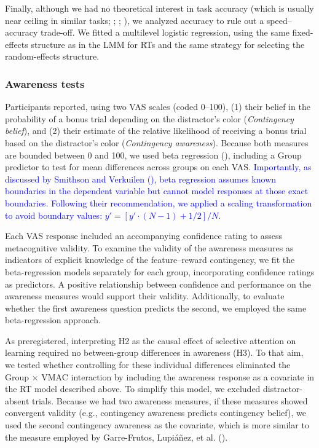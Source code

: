 \documentclass[
  man,
  floatsintext,
  longtable,
  nolmodern,
  notxfonts,
  notimes,
  mask,
  colorlinks=true,linkcolor=blue,citecolor=blue,urlcolor=blue]{apa7}
\begin{document}
Finally, although we had no theoretical interest in task accuracy (which
is usually near ceiling in similar tasks;
;
;
), we
analyzed accuracy to rule out a speed--accuracy trade-off. We fitted a
multilevel logistic regression, using the same fixed-effects structure
as in the LMM for RTs and the same strategy for selecting the
random-effects structure.

\subsubsection{Awareness tests}\label{awareness-tests}

Participants reported, using two VAS scales (coded 0--100), (1) their
belief in the probability of a bonus trial depending on the distractor's
color (\emph{Contingency belief}), and (2) their estimate of the
relative likelihood of receiving a bonus trial based on the distractor's
color (\emph{Contingency awareness}). Because both measures are bounded
between 0 and 100, we used beta regression
(), including a
Group predictor to test for mean differences across groups on each VAS.
\textcolor{blue}{Importantly, as discussed by Smithson and Verkuilen
(), beta regression assumes known
boundaries in the dependent variable but cannot model responses at those
exact boundaries. Following their recommendation, we applied a scaling
transformation to avoid boundary values:
\(y' = [y' \cdot (N - 1) + 1/2] / N\).}

Each VAS response included an accompanying confidence rating to assess
metacognitive validity. To examine the validity of the awareness
measures as indicators of explicit knowledge of the feature--reward
contingency, we fit the beta-regression models separately for each
group, incorporating confidence ratings as predictors. A positive
relationship between confidence and performance on the awareness
measures would support their validity. Additionally, to evaluate whether
the first awareness question predicts the second, we employed the same
beta-regression approach.

As preregistered, interpreting H2 as the causal effect of selective
attention on learning required no between-group differences in awareness
(H3). To that aim, we tested whether controlling for these individual
differences eliminated the Group \(\times\) VMAC interaction by
including the awareness response as a covariate in the RT model
described above. To simplify this model, we excluded distractor-absent
trials. Because we had two awareness measures, if these measures showed
convergent validity (e.g., contingency awareness predicts contingency
belief), we used the second contingency awareness as the covariate,
which is more similar to the measure employed by Garre-Frutos, Lupiáñez,
et al. ().
\end{document}
